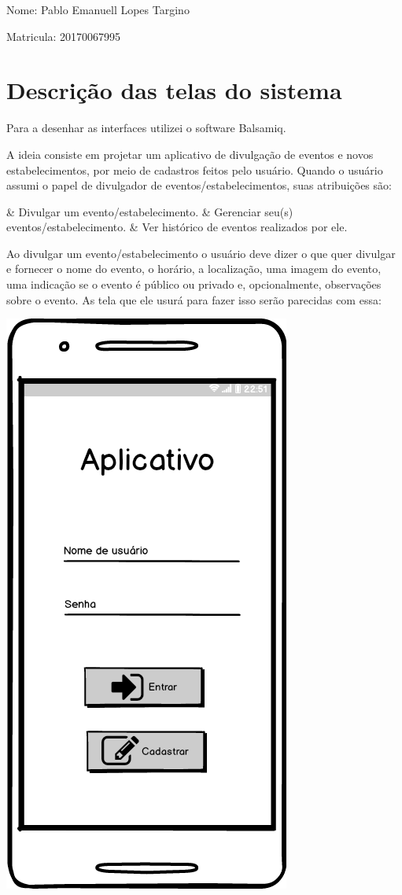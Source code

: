 \documentclass{article}
\begin{document}
\par Nome: Pablo Emanuell Lopes Targino
\par Matricula: 20170067995 \bigskip \bigskip

	\section{Descrição das telas do sistema} 

	Para a desenhar as interfaces utilizei o software Balsamiq.
	
	A ideia consiste em projetar um aplicativo de divulgação de eventos e novos estabelecimentos, por meio de cadastros feitos pelo usuário.
	Quando o usuário assumi o papel de divulgador de eventos/estabelecimentos, suas atribuições são:\medskip
	\begin{easylist}[itemize]
	& Divulgar um evento/estabelecimento.
	& Gerenciar seu(s) eventos/estabelecimento.
	& Ver histórico de eventos realizados por ele.
	\end{easylist}\medskip
	Ao divulgar um evento/estabelecimento o usuário deve dizer o que quer divulgar e fornecer o nome do evento, o horário, a localização, uma imagem do evento, uma indicação se o evento é público ou privado e, opcionalmente, observações sobre o evento. As tela que ele usurá para fazer isso serão parecidas com essa:
	\bigskip
	
	\begin{center}
	\includegraphics[scale=0.25]{ECV.png}
	\end{center}
	
\end{document}
